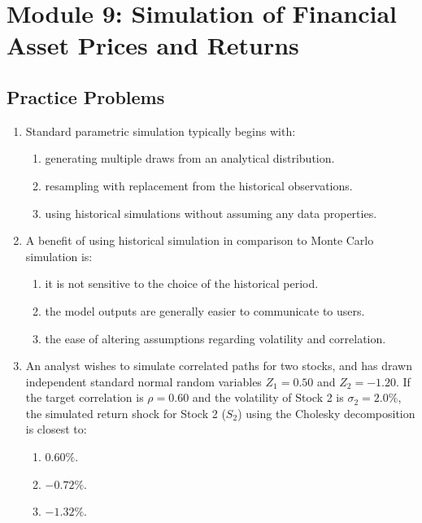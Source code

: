 \newpage

\section{Module 9: Simulation of Financial Asset Prices and Returns}
\label{sec:app_Problems_M9}

\subsection{Practice Problems}
\label{subsec:app_Problems_M9}

\begin{enumerate}
	\item Standard parametric simulation typically begins with:
	      \begin{enumerate}[label=\Alph*.]
		      \item generating multiple draws from an analytical distribution.
		      \item resampling with replacement from the historical observations.
		      \item using historical simulations without assuming any data properties.
	      \end{enumerate}

	\item A benefit of using historical simulation in comparison to Monte Carlo simulation is:
	      \begin{enumerate}[label=\Alph*.]
		      \item it is not sensitive to the choice of the historical period.
		      \item the model outputs are generally easier to communicate to users.
		      \item the ease of altering assumptions regarding volatility and correlation.
	      \end{enumerate}

	\item An analyst wishes to simulate correlated paths for two stocks, and has drawn independent standard normal random variables $Z_1 = 0.50$ and $Z_2 = -1.20$. If the target correlation is $\rho = 0.60$ and the volatility of Stock 2 is $\sigma_2 = 2.0\%$, the simulated return shock for Stock 2 ($S_2$) using the Cholesky decomposition is closest to:
	      \begin{enumerate}[label=\Alph*.]
		      \item $0.60\%$.
		      \item $-0.72\%$.
		      \item $-1.32\%$.
	      \end{enumerate}


\end{enumerate}
